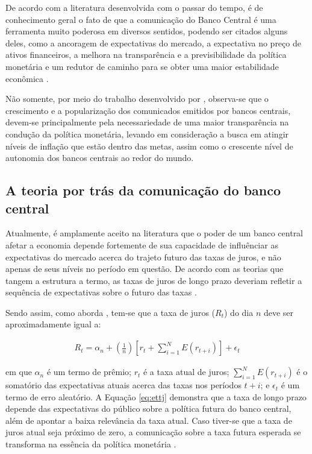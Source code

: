 De acordo com a literatura desenvolvida com o passar do tempo, é de conhecimento geral o fato de que a comunicação do Banco Central é uma ferramenta muito poderosa em diversos sentidos, podendo ser citados alguns deles, como a ancoragem de expectativas do mercado, a expectativa no preço de ativos financeiros, a melhora na transparência e a previsibilidade da política monetária e um redutor de caminho para se obter uma maior estabilidade econômica \cite{blinder2000central, mishkin2000, bernanke2004monetary}.

Não somente, por meio do trabalho desenvolvido por , observa-se que o crescimento e a popularização dos comunicados emitidos por bancos centrais, devem-se principalmente pela necessariedade de uma maior transparência na condução da política monetária, levando em consideração a busca em atingir níveis de inflação que estão dentro das metas, assim como o crescente nível de autonomia dos bancos centrais ao redor do mundo.

\subsection{A teoria por trás da comunicação do banco central}

Atualmente, é amplamente aceito na literatura que o poder de um banco central afetar a economia depende fortemente de sua capacidade de influênciar as expectativas do mercado acerca do trajeto futuro das taxas de juros, e não apenas de seus níveis no período em questão. De acordo com as teorias que tangem a estrutura a termo, as taxas de juros de longo prazo deveriam refletir a sequência de expectativas sobre o futuro das taxas \cite{blinder2008central}.

Sendo assim, como aborda , tem-se que a taxa de juros ($R_{t}$) do dia $n$ deve ser aproximadamente igual a:

\begin{ceqn}
\begin{align} \label{eq:ettj}
R_{t} = \alpha_{n} + \left( \frac{1}{n} \right) \left[r_{t} + \sum_{i=1}^{N}{E(r_{t+i})} \right] + \epsilon_{t}
\end{align}
\end{ceqn} em que $\alpha_{n}$ é um termo de prêmio; $r_{t}$ é a taxa atual de juros; $\sum_{i=1}^{N}{E(r_{t+i})}$ é o somatório das expectativas atuais acerca das taxas nos períodos $t+i$; e $\epsilon_{t}$ é um termo de erro aleatório. A Equação \eqref{eq:ettj} demonstra que a taxa de longo prazo depende das expectativas do público sobre a política futura do banco central, além de apontar a baixa relevância da taxa atual. Caso tiver-se que a taxa de juros atual seja próximo de zero, a comunicação sobre a taxa futura esperada se transforma na essência da política monetária \cite{bernanke2004monetary, woodford2005central, blinder2008central}. 

